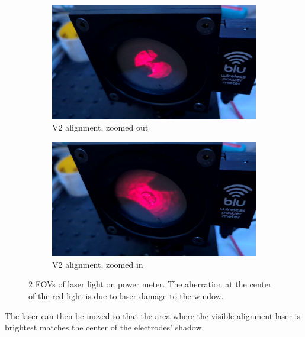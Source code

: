             \begin{figure}[!ht]
                \centering
                \begin{subfigure}[t]{0.45\textwidth}
                    \centering
                    \includegraphics[width=\textwidth]{assets/4 experiments/V2 alignment 1.png}
                    \caption{V2 alignment, zoomed out}
                \end{subfigure}
                \hfill
                \begin{subfigure}[t]{0.45\textwidth}
                    \centering
                    \includegraphics[width=\textwidth]{assets/4 experiments/V2 alignment 2.png}
                    \caption{V2 alignment, zoomed in}
                \end{subfigure}
                \caption{2 FOVs of laser light on power meter. The aberration at the center of the red light is due to laser damage to the window.}
                \label{fig:FOV}
            \end{figure}

            The laser can then be moved so that the area where the visible alignment laser is brightest matches the center of the electrodes' shadow.

